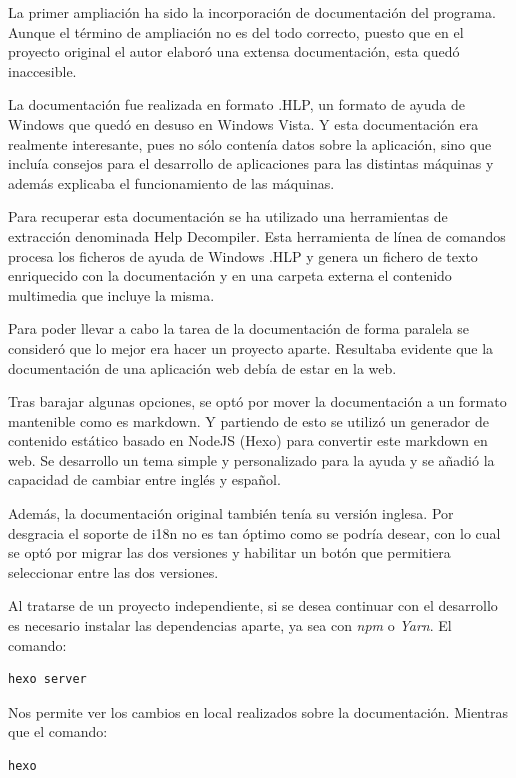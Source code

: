 
La primer ampliación ha sido la incorporación de documentación del programa. Aunque el
término de ampliación no es del todo correcto, puesto que en el proyecto original el autor
elaboró una extensa documentación, esta quedó inaccesible.

\bigskip
La documentación fue realizada en formato .HLP, un formato de ayuda de Windows que quedó
en desuso en Windows Vista. Y esta documentación era realmente interesante, pues no sólo
contenía datos sobre la aplicación, sino que incluía consejos para el desarrollo de 
aplicaciones para las distintas máquinas y además explicaba el funcionamiento de las máquinas.

\bigskip
Para recuperar esta documentación se ha utilizado una herramientas de extracción denominada
Help Decompiler. Esta herramienta de línea de comandos procesa los ficheros de ayuda de
Windows .HLP y genera un fichero de texto enriquecido con la documentación y en una carpeta
externa el contenido multimedia que incluye la misma.

\bigskip
Para poder llevar a cabo la tarea de la documentación de forma paralela se consideró que lo mejor era
hacer un proyecto aparte. Resultaba evidente que la documentación de una aplicación web debía de estar en la
web. 

\bigskip
Tras barajar algunas opciones, se optó por mover la documentación a un formato mantenible como 
es markdown. Y partiendo de esto se utilizó un generador de contenido estático basado en NodeJS (Hexo)
para convertir este markdown en web. Se desarrollo un tema simple y personalizado para la ayuda y se 
añadió la capacidad de cambiar entre inglés y español.

\bigskip
Además, la documentación original también tenía su versión inglesa. Por desgracia el soporte de i18n no
es tan óptimo como se podría desear, con lo cual se optó por migrar las dos versiones y habilitar un botón
que permitiera seleccionar entre las dos versiones.

\bigskip
Al tratarse de un proyecto independiente, si se desea continuar con el desarrollo es necesario instalar las dependencias
aparte, ya sea con \textit{npm} o \textit{Yarn}. El comando:

\begin{lstlisting}
hexo server
\end{lstlisting}

Nos permite ver los cambios en local realizados sobre la documentación. Mientras que el comando:

\begin{lstlisting}
hexo
\end{lstlisting}

